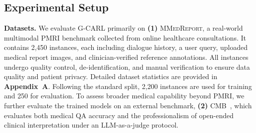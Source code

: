\documentclass[letterpaper]{article} %
\begin{document}
\subsection{Experimental Setup}
\noindent \textbf{Datasets.} 
We evaluate G-CARL primarily on \textbf{(\textcolor{deepred}{1})} \textsc{MMedReport}, a real-world multimodal PMRI benchmark collected from online healthcare consultations. It contains 2,450 instances, each including dialogue history, a user query, uploaded medical report images, and clinician-verified reference annotations. All instances undergo quality control, de-identification, and manual verification to ensure data quality and patient privacy. Detailed dataset statistics are provided in \textbf{Appendix~A}. Following the standard split, 2,200 instances are used for training and 250 for evaluation. 
To assess broader medical capability beyond PMRI, we further evaluate the trained models on an external benchmark, \textbf{(\textcolor{deepred}{2})} \textsc{CMB}~\cite{wang2024cmb}, which evaluates both medical QA accuracy and the professionalism of open-ended clinical interpretation under an LLM-as-a-judge protocol.

\end{document}
